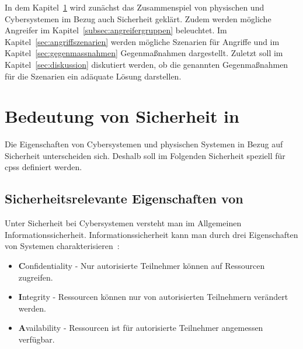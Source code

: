 \documentclass[final,bibliography=totocnumbered]{include/sikseminar}
\newcommand{\fb}[1]{\dofb#1}
\newcommand{\cps}{\glspl{cps}\xspace}
\newcommand{\dofb}[1]{\textbf{#1}\nobreak\hspace{0pt}}
\begin{document}
In dem Kapitel~\ref{sec:bedeutung-sicherheit} wird zunächst das Zusammenspiel von physischen und Cybersystemen im Bezug auch Sicherheit geklärt.
Zudem werden mögliche Angreifer im Kapitel~\ref{subsec:angreifergruppen} beleuchtet.
Im Kapitel~\ref{sec:angriffszenarien} werden mögliche Szenarien für Angriffe und im Kapitel~\ref{sec:gegenmassnahmen} Gegenmaßnahmen dargestellt.
Zuletzt soll im Kapitel~\ref{sec:diskussion} diskutiert werden, ob die genannten Gegenmaßnahmen für die Szenarien ein adäquate Lösung darstellen.

\section{Bedeutung von Sicherheit in }\label{sec:bedeutung-sicherheit}

Die Eigenschaften von Cybersystemen und physischen Systemen in Bezug auf Sicherheit unterscheiden sich.
Deshalb soll im Folgenden Sicherheit speziell für \cps definiert werden.

\subsection{Sicherheitsrelevante Eigenschaften von }\label{subsec:definition}
Unter Sicherheit bei Cybersystemen versteht man im Allgemeinen Informationssicherheit.
Informationssicherheit kann man durch drei Eigenschaften von Systemen charakterisieren~\cite{CH13}:
\begin{itemize}[noitemsep,wide=0pt]
    \item \fb{Confidentiality} - Nur autorisierte Teilnehmer können auf Ressourcen zugreifen.\label{def:confidentiality}
    \item \fb{Integrity} - Ressourcen können nur von autorisierten Teilnehmern verändert werden.\label{def:integrity}
    \item \fb{Availability} - Ressourcen ist für autorisierte Teilnehmer angemessen verfügbar.\label{def:availability}
\end{itemize}
\end{document}
